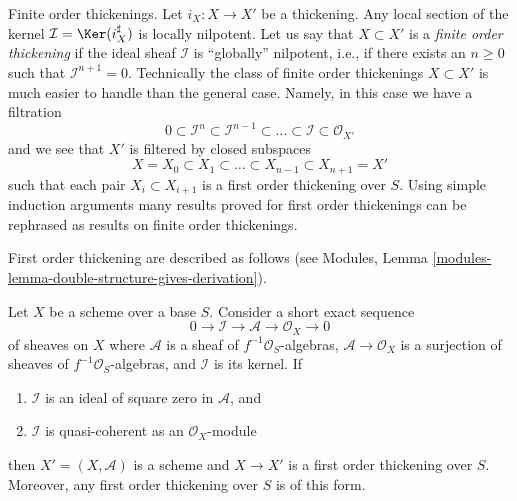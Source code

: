 \noindent
Finite order thickenings. Let $i_X : X \to X'$ be a thickening.
Any local section of the kernel
$\mathcal{I} = \Ker(i_X^\sharp)$ is locally nilpotent.
Let us say that $X \subset X'$ is a {\it finite order thickening}
if the ideal sheaf $\mathcal{I}$ is ``globally'' nilpotent, i.e.,
if there exists an $n \geq 0$ such that $\mathcal{I}^{n + 1} = 0$.
Technically the class of finite order thickenings $X \subset X'$
is much easier to handle than the general case.
Namely, in this case we have a filtration
$$
0 \subset \mathcal{I}^n \subset \mathcal{I}^{n - 1} \subset
\ldots \subset \mathcal{I} \subset \mathcal{O}_{X'}
$$
and we see that $X'$ is filtered by closed subspaces
$$
X = X_0 \subset X_1 \subset \ldots \subset X_{n - 1} \subset X_{n + 1} = X'
$$
such that each pair $X_i \subset X_{i + 1}$ is a first order thickening
over $S$. Using simple induction arguments many results proved for first order
thickenings can be rephrased as results on finite order thickenings.

\medskip\noindent
First order thickening are described as follows (see
Modules, Lemma \ref{modules-lemma-double-structure-gives-derivation}).

\begin{lemma}
\label{lemma-first-order-thickening}
Let $X$ be a scheme over a base $S$. Consider a short exact sequence
$$
0 \to \mathcal{I} \to \mathcal{A} \to \mathcal{O}_X \to 0
$$
of sheaves on $X$ where $\mathcal{A}$ is a sheaf of
$f^{-1}\mathcal{O}_S$-algebras,
$\mathcal{A} \to \mathcal{O}_X$ is a surjection
of sheaves of $f^{-1}\mathcal{O}_S$-algebras, and $\mathcal{I}$ is its kernel.
If
\begin{enumerate}
\item $\mathcal{I}$ is an ideal of square zero in $\mathcal{A}$, and
\item $\mathcal{I}$ is quasi-coherent as an $\mathcal{O}_X$-module
\end{enumerate}
then $X' = (X, \mathcal{A})$ is a scheme and $X \to X'$ is a first
order thickening over $S$. Moreover, any first order thickening over
$S$ is of this form.
\end{lemma}

